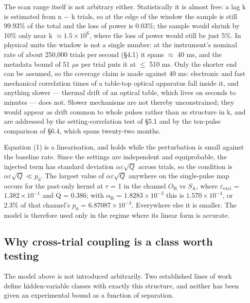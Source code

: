 \documentclass[
  11pt,
]{article}
\begin{document}
The scan range itself is not arbitrary either. Statistically it is
almost free: a lag k is estimated from n \(-\) \textbar k\textbar{}
trials, so at the edge of the window the sample is still 99.93\% of the
total and the loss of power is 0.03\%; the sample would shrink by 10\%
only near \textbar k\textbar{} \(\approx 1.5 \times 10^{6}\), where the
loss of power would still be just 5\%. In physical units the window is
not a single number: at the instrument's nominal rate of about 250,000
trials per second (\S4.1) it spans \(\approx\) 40 ms, and the metadata
bound of 51 \(\mu\)s per trial puts it at \(\le\) 510 ms. Only the
shorter end can be assumed, so the coverage claim is made against 40 ms:
electronic and fast mechanical correlation times of a table-top optical
apparatus fall inside it, and anything slower --- thermal drift of an
optical table, which lives on seconds to minutes --- does not. Slower
mechanisms are not thereby unconstrained; they would appear as drift
common to whole pulses rather than as structure in k, and are addressed
by the setting-correlation test of \S5.1 and by the ten-pulse comparison
of \S6.4, which spans twenty-two months.

Equation (1) is a linearisation, and holds while the perturbation is
small against the baseline rate. Since the settings are independent and
equiprobable, the injected term has standard deviation
\(\alpha\varepsilon\sqrt{Q}\) across trials, so the condition is
\(\alpha\varepsilon\sqrt{Q} \ll p_0\). The largest value of
\(\alpha\varepsilon\sqrt{Q}\) anywhere on the single-pulse map occurs
for the past-only kernel at \(\tau\) = 1 in the channel
\(O_{\mathrm{B}}\) vs \(S_{\mathrm{A}}\), where
\(\varepsilon_{\mathrm{excl}}\) = \(1.382 \times 10^{-1}\) and Q =
0.386; with \(\alpha_{\mathrm{B}}\) = \(1.8283 \times 10^{-3}\) this is
\(1.570 \times 10^{-4}\), or 2.3\% of that channel's \(p_{0}\) =
\(6.87087 \times 10^{-3}\). Everywhere else it is smaller. The model is
therefore used only in the regime where its linear form is accurate.

\subsection{Why cross-trial coupling is a class worth testing}

The model above is not introduced arbitrarily. Two established lines of
work define hidden-variable classes with exactly this structure, and
neither has been given an experimental bound as a function of
separation.
\end{document}
